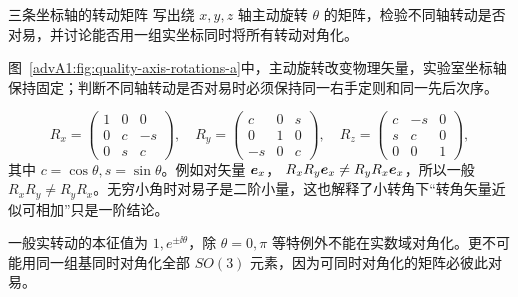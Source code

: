 \begin{advexamplebox}{三条坐标轴的转动矩阵}\label{advA1:ex:axis-rotations}
写出绕 $x,y,z$ 轴主动旋转 $\theta$ 的矩阵，检验不同轴转动是否对易，并讨论能否用一组实坐标同时将所有转动对角化。

\begin{qualityfigure}
\label{advA1:fig:quality-axis-rotations-q}
\end{qualityfigure}
\end{advexamplebox}
\begin{advsolution}
\begin{qualityfigure}
\label{advA1:fig:quality-axis-rotations-a}
\end{qualityfigure}
图~\ref{advA1:fig:quality-axis-rotations-a}中，主动旋转改变物理矢量，实验室坐标轴保持固定；判断不同轴转动是否对易时必须保持同一右手定则和同一先后次序。

\[
 R_x=\begin{pmatrix}1&0&0\\0&c&-s\\0&s&c\end{pmatrix},
 \quad
 R_y=\begin{pmatrix}c&0&s\\0&1&0\\-s&0&c\end{pmatrix},
 \quad
 R_z=\begin{pmatrix}c&-s&0\\s&c&0\\0&0&1\end{pmatrix},
\]
其中 $c=\cos\theta, s=\sin\theta$。例如对矢量 $\bm{e}_x$，
$R_xR_y\bm{e}_x\ne R_yR_x\bm{e}_x$，所以一般 $R_xR_y\ne R_yR_x$。无穷小角时对易子是二阶小量，这也解释了小转角下“转角矢量近似可相加”只是一阶结论。

一般实转动的本征值为 $1,e^{\pm\ii\theta}$，除 $\theta=0,\pi$ 等特例外不能在实数域对角化。更不可能用同一组基同时对角化全部 $SO(3)$ 元素，因为可同时对角化的矩阵必彼此对易。
\end{advsolution}

